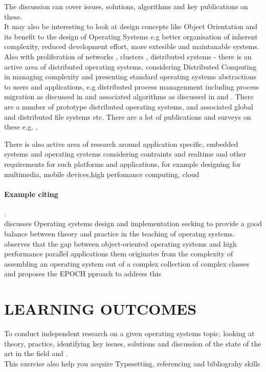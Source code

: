 \documentclass[11pt]{article} %
\begin{document}
\noindent The discussion can cover issues, solutions, algorithms and key publications on these. \\
 
\noindent It may also be interesting to look at design concepts like Object Orientation \cite{ooadBooch1994} and its benefit to the design of Operating Systems e.g better organisation of inherent complexity, reduced development effort, more extesible and maintanable systems. \\
\noindent Also with proliferation of networks \cite{dataCommsStallings1997}, clusters \cite{clustersPfister1997}, distributed systems \cite{princDSGarg1996}  - there is an active area of distributed operating systems,
considering Distributed Computing \cite{DCSCavasant1994} in managing complexity and presenting standard operating systems abstractions to users and applications, e.g distributed process managenment including process migration as discussed in \cite{procMigrationEskicioglu1990} and associated algorithms as discussed in  \cite{dosSingha1997} and \cite{dapRaynal1988} . There are a number of prototype distributed operating systems, and associated global and distributed file systems etc. There are a lot of publications and surveys on these e.g. \cite{Tanenbaum92theamoeba}, \cite{dosTanenbaum985}

\noindent There is also active area of research around application specific, embedded systems and operating systems considering contraints and realtime and other requirements for such platforms and applications, for example designing for multimedia, mobile devices,high perfomance computing, cloud



\noindent \paragraph{Example citing}. \\ 
\cite{osDesignImpTanenbaum1997} discusses Operating systems design and implementation seeking to provide a good balance between theory and practice in the teaching of operatng systems. \cite{Frohlich99highperformance} observes that the gap between object-oriented operating systems and  high performance parallel applications them originates from the complexity of assembling an operating system out of a complex collection of complex classes and proposes the EPOCH pproach to address this

\section{LEARNING OUTCOMES}
\noindent To conduct independent research on a given operating systems topic, looking at theory, practice, identifying key issues, solutions and discussion of the state of the art in the field and . 
\\ This exercise also help you acquire Typesetting, referencing and bibliograhy skills 
\end{document}
